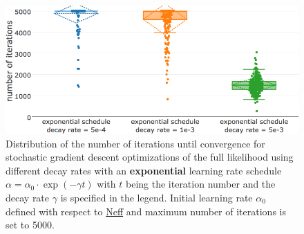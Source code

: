 \documentclass[11pt,a4paper,twoside]{book}
\theoremstyle{definition}
\theoremstyle{definition}
\theoremstyle{remark}
\begin{document}
\begin{figure}

{\centering \includegraphics[width=0.9\linewidth]{img/full_likelihood/appendix/distribution_numiterations_against_exponential_learningrate_schedule} 

}

\caption{Distribution of the
number of iterations until convergence for stochastic gradient descent
optimizations of the full likelihood using different decay rates with an
\textbf{exponential} learning rate schedule
\(\alpha = \alpha_0 \cdot\exp(- \gamma t)\) with \(t\) being the
iteration number and the decay rate \(\gamma\) is specified in the
legend. Initial learning rate \(\alpha_0\) defined with respect to
\protect\hyperlink{abbrev}{Neff} and maximum number of iterations is set
to 5000.}\label{fig:cd-numit-exp-learning-rate-schedule}
\end{figure}
\end{document}
